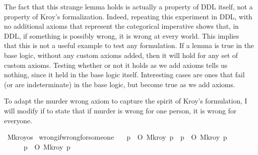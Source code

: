 \begin{isabellebody}
\begin{isamarkuptext}
The fact that this strange lemma holds is actually a property of DDL itself, not a property
of Kroy's formalization. Indeed, repeating this experiment in DDL, with no
additional axioms that represent the categorical imperative shows that, in DDL, if something is 
possibly wrong, it is wrong at every world. This implies that this is not a useful example to test any formulation. 
If a lemma is true in the base logic, without any custom axioms added, then it will hold for any set of  
custom axioms. Testing whether or not it holds as we add axioms tells us nothing, since it held in 
the base logic itself. Interesting cases are ones that fail (or are indeterminate) in the base logic, 
but become true as we add axioms.%
\end{isamarkuptext}\isamarkuptrue%
%
\begin{isamarkuptext}%
To adapt the murder wrong axiom to capture the spirit of Kroy's formulation, I will modify if 
to state that if murder is wrong for one person, it is wrong for everyone.%
\end{isamarkuptext}\isamarkuptrue%
\isamarkupfalse%
\ M{\isacharunderscore}kroy{\isacharcolon}{\isacharcolon}{\isachardoublequoteopen}os{\isachardoublequoteclose}\isanewline
%
\isanewline
\isanewline
{}\isamarkupfalse%
\ wrong{\isacharunderscore}if{\isacharunderscore}wrong{\isacharunderscore}for{\isacharunderscore}someone{\isacharcolon}\isanewline
\ \ \ {\isachardoublequoteopen}{\isacharparenleft}{\isasymexists}p{\isachardot}\ {\isasymTurnstile}\ O\ {\isacharbraceleft}\isactrlbold {\isasymnot}{\isacharparenleft}M{\isacharunderscore}kroy\ p{\isacharparenright}{\isacharbraceright}{\isacharparenright}\ {\isasymlongrightarrow}\ {\isacharparenleft}{\isasymforall}p{\isachardot}\ {\isasymTurnstile}\ O\ {\isacharbraceleft}\isactrlbold {\isasymnot}{\isacharparenleft}M{\isacharunderscore}kroy\ p{\isacharparenright}{\isacharbraceright}{\isacharparenright}{\isachardoublequoteclose}\isanewline
%
\isadelimproof
\ \ %
\endisadelimproof
%
\isatagproof
{}\isamarkupfalse%
\ \isanewline
\ \ \ \ \isamarkupfalse%
\ {\isachardoublequoteopen}{\isacharparenleft}{\isasymexists}p{\isachardot}\ {\isasymTurnstile}\ O\ {\isacharbraceleft}\isactrlbold {\isasymnot}{\isacharparenleft}M{\isacharunderscore}kroy\ p{\isacharparenright}{\isacharbraceright}{\isacharparenright}{\isachardoublequoteclose}\isanewline
\ \ \ \ \isamarkupfalse%

\end{isabellebody}
